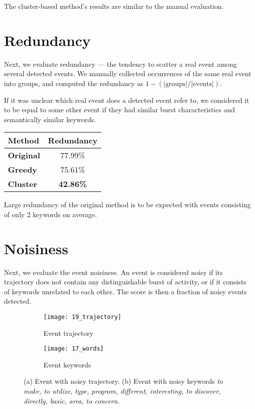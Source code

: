 The cluster-based method's results are similar to the manual evaluation.

\section{Redundancy}

Next, we evaluate redundancy --- the tendency to scatter a real event among several detected events. We manually collected occurrences of the same real event into groups, and computed the redundancy as $1 - (\left| \text{groups} \right| / \left| \text{events} \right|)$.

If it was unclear which real event does a detected event refer to, we considered it to be equal to some other event if they had similar burst characteristics and semantically similar keywords.

\hspace{\fill}

\begin{minipage}{\linewidth}
\centering
\begin{tabular}{ l c }\toprule[1.5pt]
\bf Method 	 & \bf Redundancy \\ \midrule
\bf Original &  77.99\% \\
\bf Greedy   &  75.61\% \\
\bf Cluster &  \bf 42.86\% \\ \bottomrule[1.25pt]
\end {tabular}\par
{} \label{tab:title} 
\end{minipage}

\hspace{\fill}

Large redundancy of the original method is to be expected with events consisting of only 2 keywords on average.

\section{Noisiness}

Next, we evaluate the event noisiness. An event is considered noisy if its trajectory does not contain any distinguishable burst of activity, or if it consists of keywords unrelated to each other. The score is then a fraction of noisy events detected.


\begin{figure}[H]
\centering
\begin{subfigure}{.5\textwidth}
  \centering
  \texttt{[image: 19\_trajectory]}  %
  \caption{Event trajectory}
  \label{fig:noisy-trajectory}
\end{subfigure}%
\begin{subfigure}{.5\textwidth}
  \centering
  \texttt{[image: 17\_words]}  %
  \caption{Event keywords}
  \label{fig:noisy-keywords}
\end{subfigure}
\caption{(a) Event with noisy trajectory. (b) Event with noisy keywords \textit{to make, to utilize, type, program, different, interesting, to discover, directly, basic, area, to concern}.}
\end{figure}


